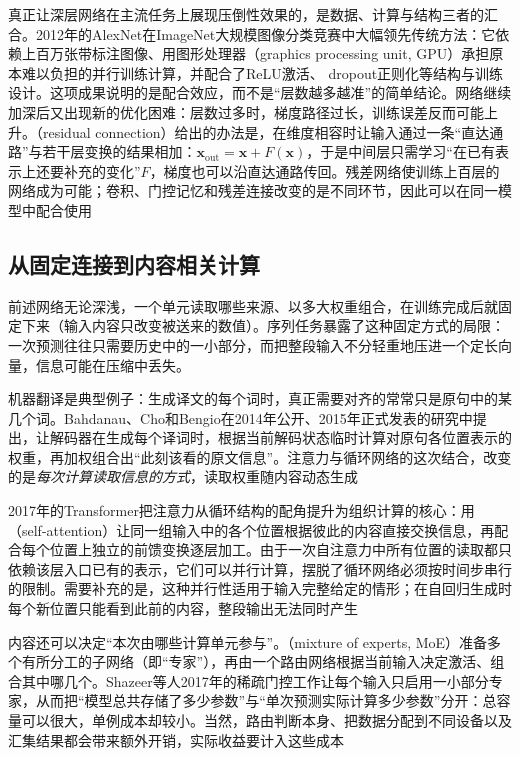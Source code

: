 真正让深层网络在主流任务上展现压倒性效果的，是数据、计算与结构三者的汇合。2012年的AlexNet在ImageNet大规模图像分类竞赛中大幅领先传统方法：它依赖上百万张带标注图像、用图形处理器（graphics processing unit, GPU）承担原本难以负担的并行训练计算，并配合了ReLU激活、 dropout正则化等结构与训练设计。这项成果说明的是配合效应，而不是“层数越多越准”的简单结论。网络继续加深后又出现新的优化困难：层数过多时，梯度路径过长，训练误差反而可能上升。（residual connection）给出的办法是，在维度相容时让输入通过一条“直达通路”与若干层变换的结果相加：$\bm{x}_{\text{out}}=\bm{x}+F(\bm{x})$，于是中间层只需学习“在已有表示上还要补充的变化”$F$，梯度也可以沿直达通路传回。残差网络使训练上百层的网络成为可能；卷积、门控记忆和残差连接改变的是不同环节，因此可以在同一模型中配合使用

\subsection{从固定连接到内容相关计算}
\label{sec:neural-history-content-dependent}

前述网络无论深浅，一个单元读取哪些来源、以多大权重组合，在训练完成后就固定下来（输入内容只改变被送来的数值）。序列任务暴露了这种固定方式的局限：一次预测往往只需要历史中的一小部分，而把整段输入不分轻重地压进一个定长向量，信息可能在压缩中丢失。

机器翻译是典型例子：生成译文的每个词时，真正需要对齐的常常只是原句中的某几个词。Bahdanau、Cho和Bengio在2014年公开、2015年正式发表的研究中提出，让解码器在生成每个译词时，根据当前解码状态临时计算对原句各位置表示的权重，再加权组合出“此刻该看的原文信息”。注意力与循环网络的这次结合，改变的是\emph{每次计算读取信息的方式}，读取权重随内容动态生成

2017年的Transformer把注意力从循环结构的配角提升为组织计算的核心：用（self-attention）让同一组输入中的各个位置根据彼此的内容直接交换信息，再配合每个位置上独立的前馈变换逐层加工。由于一次自注意力中所有位置的读取都只依赖该层入口已有的表示，它们可以并行计算，摆脱了循环网络必须按时间步串行的限制。需要补充的是，这种并行性适用于输入完整给定的情形；在自回归生成时每个新位置只能看到此前的内容，整段输出无法同时产生

内容还可以决定“本次由哪些计算单元参与”。（mixture of experts, MoE）准备多个有所分工的子网络（即“专家”），再由一个路由网络根据当前输入决定激活、组合其中哪几个。Shazeer等人2017年的稀疏门控工作让每个输入只启用一小部分专家，从而把“模型总共存储了多少参数”与“单次预测实际计算多少参数”分开：总容量可以很大，单例成本却较小。当然，路由判断本身、把数据分配到不同设备以及汇集结果都会带来额外开销，实际收益要计入这些成本

